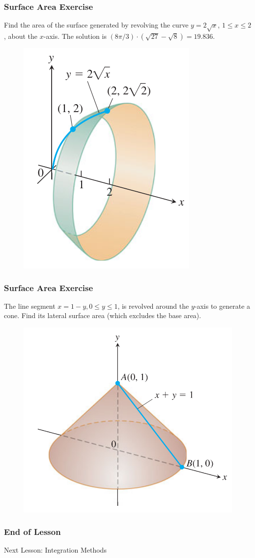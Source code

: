 \documentclass[xcolor=dvipsnames]{beamer}
\begin{document}
\begin{frame}
  \frametitle{Surface Area Exercise} 
  {\ubung} Find the area of the surface generated by revolving the
  curve $y=2\sqrt{x}$, $1\leq{}x\leq{}2$, about the $x$-axis. The
  solution is $(8\pi/3)\cdot{}(\sqrt{27}-\sqrt{8})=19.836$.
\begin{figure}[h]
  \includegraphics[scale=0.3]{./diagrams/revosurf1.png}
\end{figure}
\end{frame}

\begin{frame}
  \frametitle{Surface Area Exercise}
{\ubung} The line segment $x=1-y,0\leq{}y\leq{}1$, is revolved around
the $y$-axis to generate a cone. Find its lateral surface area (which
excludes the base area).
\begin{figure}[h]
  \includegraphics[scale=0.25]{./diagrams/conelateral.png}
\end{figure}
\end{frame}

\begin{frame}
  \frametitle{End of Lesson}
Next Lesson: Integration Methods
\end{frame}
\end{document}
